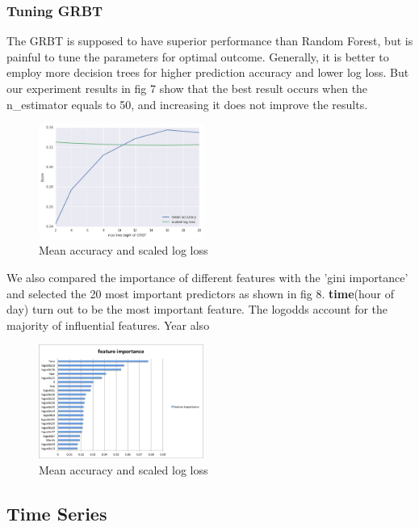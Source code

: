 \documentclass[11pt,conference]{IEEEtran}
\begin{document}
\subsubsection{Tuning GRBT}
The GRBT is supposed to have superior performance than Random Forest, but is painful to tune the parameters for optimal outcome. Generally, it is better to employ more decision trees for higher prediction accuracy and lower log loss. But our experiment results in fig 7 show that the best result occurs when the n\_estimator equals to 50, and increasing it does not improve the results.
\begin{figure}[H]
\begin{center}
\includegraphics [width=0.48\textwidth]{pics/grbt_p1.png}
\caption{Mean accuracy and scaled log loss}
\end{center}
\end{figure}
We also compared the importance of different features with the 'gini importance' and selected the 20 most important predictors as shown in fig 8. \textbf{time}(hour of day) turn out to be the most important feature. The logodds account for the majority of influential features. Year also 
\begin{figure}[H]
\begin{center}
\includegraphics [width=0.48\textwidth]{pics/grbt_p2.png}
\caption{Mean accuracy and scaled log loss}
\end{center}
\end{figure}

\subsection{Time Series}
\end{document}
